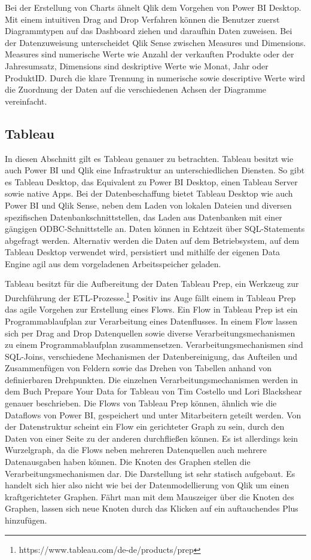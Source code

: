 Bei der Erstellung von Charts ähnelt Qlik dem Vorgehen von Power BI Desktop. Mit einem intuitiven
Drag and Drop Verfahren können die Benutzer zuerst Diagrammtypen auf das Dashboard ziehen und
daraufhin Daten zuweisen. Bei der Datenzuweisung unterscheidet Qlik Sense zwischen Measures und
Dimensions. Measures sind numerische Werte wie Anzahl der verkauften Produkte oder der Jahresumsatz,
Dimensions sind deskriptive Werte wie Monat, Jahr oder ProduktID.\cite{TutorialsSpotMeasuresDimensions}
Durch die klare Trennung in numerische sowie descriptive Werte wird die Zuordnung der Daten
auf die verschiedenen Achsen der Diagramme vereinfacht.

\subsection{Tableau}
\label{subsec:tableau}
In diesen Abschnitt gilt es Tableau genauer zu betrachten. Tableau besitzt wie auch Power BI und Qlik
eine Infrastruktur an unterschiedlichen Diensten. So gibt es Tableau Desktop, das Equivalent zu Power BI
Desktop, einen Tableau Server sowie native Apps. Bei der Datenbeschaffung bietet Tableau Desktop wie auch
Power BI und Qlik Sense, neben dem Laden von lokalen Dateien und diversen spezifischen Datenbankschnittstellen,
das Laden aus Datenbanken mit einer gängigen ODBC-Schnittstelle an. Daten können in Echtzeit
über SQL-Statements abgefragt werden. Alternativ werden die Daten auf dem Betriebsystem, auf dem
Tableau Desktop verwendet wird, persistiert und mithilfe der eigenen Data Engine agil aus dem
vorgeladenen Arbeitsspeicher geladen.\cite[S. 50]{ProTableauBook}

Tableau besitzt für die Aufbereitung der Daten Tableau Prep, ein Werkzeug zur Durchführung der
ETL-Prozesse.\footnote{https://www.tableau.com/de-de/products/prep} Positiv ins Auge fällt einem
in Tableau Prep das agile Vorgehen zur Erstellung eines Flows. Ein Flow in Tableau Prep ist ein Programmablaufplan
zur Verarbeitung eines Datenflusses. In einem Flow lassen sich per Drag and Drop Datenquellen sowie diverse Verarbeitungsmechanismen zu einem Programmablaufplan
zusammensetzen. Verarbeitungsmechanismen sind SQL-Joins, verschiedene Mechanismen der Datenbereinigung,
das Aufteilen und Zusammenfügen von Feldern sowie das Drehen von Tabellen anhand von definierbaren Drehpunkten.
Die einzelnen Verarbeitungsmechanismen werden in dem Buch Prepare Your Data for Tableau von Tim Costello und
Lori Blackshear genauer beschrieben.\cite{PrepareYourDataForTableauBook} Die Flows von Tableau Prep können,
ähnlich wie die Dataflows von Power BI, gespeichert und unter Mitarbeitern geteilt werden. Von der Datenstruktur
scheint ein Flow ein gerichteter Graph zu sein, durch den Daten von einer Seite zu der anderen durchfließen
können. Es ist allerdings kein Wurzelgraph, da die Flows neben mehreren Datenquellen auch mehrere Datenausgaben
haben können. Die Knoten des Graphen stellen die Verarbeitungsmechanismen dar. Die Darstellung ist sehr statisch
aufgebaut. Es handelt sich hier also nicht wie bei der Datenmodellierung von Qlik um einen kraftgerichteter Graphen.
Fährt man mit dem Mauszeiger über die Knoten des Graphen, lassen sich neue Knoten durch das Klicken auf ein
auftauchendes Plus hinzufügen.


